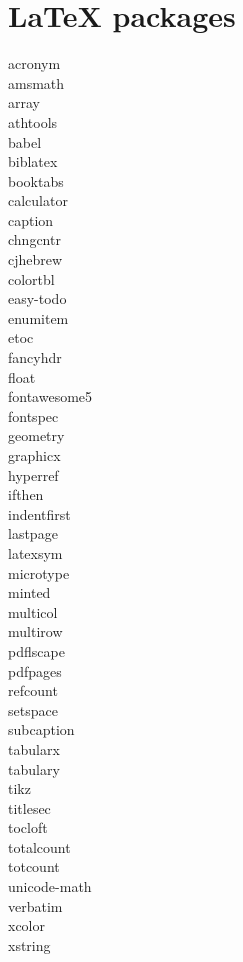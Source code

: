 \documentclass [8pt] {extarticle}
\begin{document}
    \section {LaTeX packages}

    acronym \\
    amsmath \\
    array \\
    athtools \\
    babel \\
    biblatex \\
    booktabs \\
    calculator \\
    caption \\
    chngcntr \\
    cjhebrew \\
    colortbl \\
    easy-todo \\
    enumitem \\
    etoc \\
    fancyhdr \\
    float \\
    fontawesome5 \\
    fontspec \\
    geometry \\
    graphicx \\
    hyperref \\
    ifthen \\
    indentfirst \\
    lastpage \\
    latexsym \\
    microtype \\
    minted \\
    multicol \\
    multirow \\
    pdflscape \\
    pdfpages \\
    refcount \\
    setspace \\
    subcaption \\
    tabularx \\
    tabulary \\
    tikz \\
    titlesec \\
    tocloft \\
    totalcount \\
    totcount \\
    unicode-math \\
    verbatim \\
    xcolor \\
    xstring \\
\end{document}
